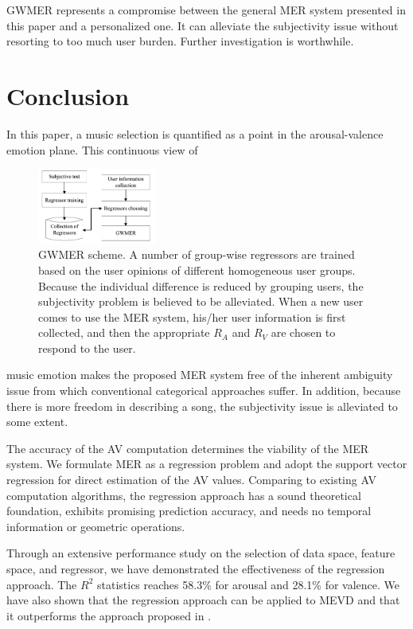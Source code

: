 \documentclass[journal, twoside]{IEEEtran}
\begin{document}
GWMER represents a compromise between the general MER system presented in this paper and a personalized one. It can alleviate the subjectivity issue without resorting to too much user burden. Further investigation is worthwhile.








\section{Conclusion}
In this paper, a music selection is quantified as a point in the arousal-valence emotion plane. This continuous view of

\begin{figure}[h]
\centering
\captionsetup{justification=centering}
\includegraphics[width=0.35\textwidth, height=0.2\textwidth]{fig7.png}
\caption{GWMER scheme. A number of group-wise regressors are trained based
on the user opinions of different homogeneous user groups. Because the individual difference is reduced by grouping users, the subjectivity problem is believed to be alleviated. When a new user comes to use the MER system, his/her
user information is first collected, and then the appropriate $R_A$ and $R_V$ are
chosen to respond to the user.}
\label{fig3}
\end{figure}

music emotion makes the proposed MER system free of the inherent ambiguity issue from which conventional categorical approaches suffer. In addition, because there is more freedom in describing a song, the subjectivity issue is alleviated to some extent.

The accuracy of the AV computation determines the viability of the MER system. We formulate MER as a regression problem and adopt the support vector regression for direct estimation of the AV values. Comparing to existing AV computation algorithms, the regression approach has a sound theoretical foundation, exhibits promising prediction accuracy, and needs no temporal information or geometric operations.

Through an extensive performance study on the selection of data space, feature space, and regressor, we have demonstrated the effectiveness of the regression approach. The $R^2$ statistics reaches 58.3\% for arousal and 28.1\% for valence. We have also shown that the regression approach can be applied to MEVD and that it outperforms the approach proposed in \cite{10}.
\end{document}
